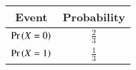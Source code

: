 
\begin{center}
\begin{tabular}{|c|c|}
\hline
\textbf{Event}& \textbf{Probability} \\ \hline
$\Pr\left(X = 0\right)$ & 	$\frac{2}{3}$ \\ \hline
$\Pr\left(X = 1\right)$ & 	$\frac{1}{3}$ \\ \hline
\end{tabular}
\end{center}

